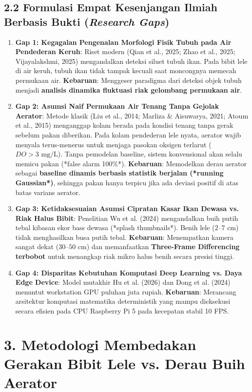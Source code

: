\documentclass[10pt,a4paper]{article}
\providecommand{\text}[1]{\mbox{#1}}
\begin{document}
\subsection*{2.2 Formulasi Empat Kesenjangan Ilmiah Berbasis Bukti (\textit{Research Gaps})}
\begin{enumerate}
    \item \textbf{Gap 1: Kegagalan Pengenalan Morfologi Fisik Tubuh pada Air Pendederan Keruh}:
    Riset modern (Qian et al., 2025; Zhao et al., 2025; Vijayalakshmi, 2025) mengandalkan deteksi siluet tubuh ikan. Pada bibit lele di air keruh, tubuh ikan tidak tampak kecuali saat moncongnya memecah permukaan air. \textbf{Kebaruan}: Menggeser paradigma dari deteksi objek tubuh menjadi \textbf{analisis dinamika fluktuasi riak gelombang permukaan air}.
    \item \textbf{Gap 2: Asumsi Naif Permukaan Air Tenang Tanpa Gejolak Aerator}:
    Metode klasik (Liu et al., 2014; Marliza \& Aisuwarya, 2021; Atoum et al., 2015) menganggap kolam berada pada kondisi tenang tanpa gerak sebelum pakan diberikan. Pada kolam pendederan lele nyata, aerator wajib menyala terus-menerus untuk menjaga pasokan oksigen terlarut ($DO > 3\text{ mg/L}$). Tanpa pemodelan baseline, sistem konvensional akan selalu memicu pakan (*false alarm 100\%*). \textbf{Kebaruan}: Memodelkan derau aerator sebagai \textbf{baseline dinamis berbasis statistik berjalan (*running Gaussian*)}, sehingga pakan hanya terpicu jika ada deviasi positif di atas batas varians aerator.
    \item \textbf{Gap 3: Ketidaksesuaian Asumsi Cipratan Kasar Ikan Dewasa vs. Riak Halus Bibit}:
    Penelitian Wu et al. (2024) mengandalkan buih putih tebal kibasan ekor bass dewasa (*splash thumbnails*). Benih lele ($2\text{--}7\text{ cm}$) tidak menghasilkan busa putih tebal. \textbf{Kebaruan}: Menempatkan kamera sangat dekat ($30\text{--}50\text{ cm}$) dan memanfaatkan \textbf{Three-Frame Differencing terbobot} untuk menangkap riak mikro halus benih secara presisi tinggi.
    \item \textbf{Gap 4: Disparitas Kebutuhan Komputasi Deep Learning vs. Daya Edge Device}:
    Model mutakhir Hu et al. (2026) dan Dong et al. (2024) menuntut workstation GPU puluhan juta rupiah. \textbf{Kebaruan}: Merancang arsitektur komputasi matematika deterministik yang mampu dieksekusi secara efisien pada CPU Raspberry Pi 5 pada kecepatan stabil 10 FPS.
\end{enumerate}

\section*{3. Metodologi Membedakan Gerakan Bibit Lele vs. Derau Buih Aerator}
\end{document}
